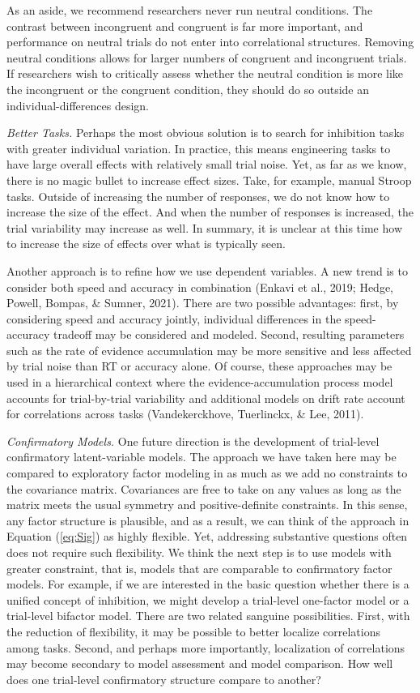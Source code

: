 \documentclass[
  english,
  ,man]{apa6}
\begin{document}
As an aside, we recommend researchers never run neutral conditions. The contrast between incongruent and congruent is far more important, and performance on neutral trials do not enter into correlational structures. Removing neutral conditions allows for larger numbers of congruent and incongruent trials. If researchers wish to critically assess whether the neutral condition is more like the incongruent or the congruent condition, they should do so outside an individual-differences design.

\emph{Better Tasks.} Perhaps the most obvious solution is to search for inhibition tasks with greater individual variation. In practice, this means engineering tasks to have large overall effects with relatively small trial noise. Yet, as far as we know, there is no magic bullet to increase effect sizes. Take, for example, manual Stroop tasks. Outside of increasing the number of responses, we do not know how to increase the size of the effect. And when the number of responses is increased, the trial variability may increase as well. In summary, it is unclear at this time how to increase the size of effects over what is typically seen.

Another approach is to refine how we use dependent variables. A new trend is to consider both speed and accuracy in combination (Enkavi et al., 2019; Hedge, Powell, Bompas, \& Sumner, 2021). There are two possible advantages: first, by considering speed and accuracy jointly, individual differences in the speed-accuracy tradeoff may be considered and modeled. Second, resulting parameters such as the rate of evidence accumulation may be more sensitive and less affected by trial noise than RT or accuracy alone. Of course, these approaches may be used in a hierarchical context where the evidence-accumulation process model accounts for trial-by-trial variability and additional models on drift rate account for correlations across tasks (Vandekerckhove, Tuerlinckx, \& Lee, 2011).

\emph{Confirmatory Models.} One future direction is the development of trial-level confirmatory latent-variable models. The approach we have taken here may be compared to exploratory factor modeling in as much as we add no constraints to the covariance matrix. Covariances are free to take on any values as long as the matrix meets the usual symmetry and positive-definite constraints. In this sense, any factor structure is plausible, and as a result, we can think of the approach in Equation (\ref{eq:Sig}) as highly flexible. Yet, addressing substantive questions often does not require such flexibility. We think the next step is to use models with greater constraint, that is, models that are comparable to confirmatory factor models. For example, if we are interested in the basic question whether there is a unified concept of inhibition, we might develop a trial-level one-factor model or a trial-level bifactor model. There are two related sanguine possibilities. First, with the reduction of flexibility, it may be possible to better localize correlations among tasks. Second, and perhaps more importantly, localization of correlations may become secondary to model assessment and model comparison. How well does one trial-level confirmatory structure compare to another?
\end{document}
